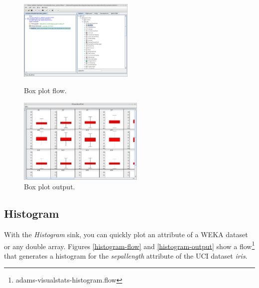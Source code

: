 \documentclass[a4paper]{book}
\begin{document}
\begin{figure}[ht]
  \begin{minipage}[t]{0.5\linewidth}
    \centering
    \includegraphics[width=5.5cm]{images/boxplot-flow.png}
    \caption{Box plot flow.}
    \label{boxplot-flow}
  \end{minipage}
  \hspace{0.5cm}
  \begin{minipage}[t]{0.5\linewidth}
    \centering
    \includegraphics[width=6.0cm]{images/boxplot-output.png}
    \caption{Box plot output.}
    \label{boxplot-output}
  \end{minipage}
\end{figure}

\clearpage
\subsection{Histogram}
With the \textit{Histogram} sink, you can quickly plot an attribute of
a WEKA dataset or any double array. Figures \ref{histogram-flow} and 
\ref{histogram-output} show a flow\footnote{adams-visualstats-histogram.flow}
that generates a histogram for the \textit{sepallength} attribute of the
UCI dataset \textit{iris}.
\end{document}
